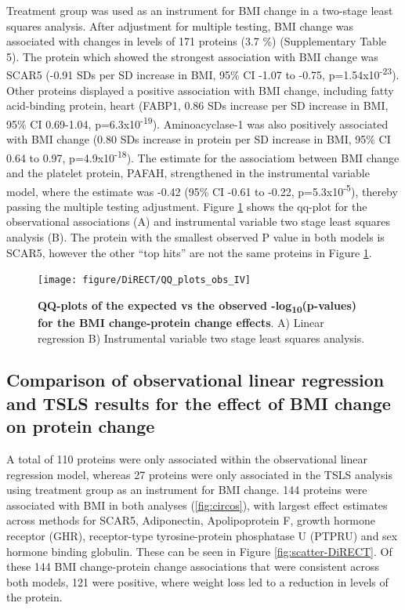 \documentclass[11pt,twoside]{bristolthesis}
\begin{document}
Treatment group was used as an instrument for BMI change in a two-stage least squares analysis. After adjustment for multiple testing, BMI change was associated with changes in levels of 171 proteins (3.7 \%) (Supplementary Table 5). The protein which showed the strongest association with BMI change was SCAR5 (-0.91 SDs per SD increase in BMI, 95\% CI -1.07 to -0.75, p=1.54x10\textsuperscript{-23}). Other proteins displayed a positive association with BMI change, including fatty acid-binding protein, heart (FABP1, 0.86 SDs increase per SD increase in BMI, 95\% CI 0.69-1.04, p=6.3x10\textsuperscript{-19}). Aminoacyclase-1 was also positively associated with BMI change (0.80 SDs increase in protein per SD increase in BMI, 95\% CI 0.64 to 0.97, p=4.9x10\textsuperscript{-18}). The estimate for the associatiom between BMI change and the platelet protein, PAFAH, strengthened in the instrumental variable model, where the estimate was -0.42 (95\% CI -0.61 to -0.22, p=5.3x10\textsuperscript{-5}), thereby passing the multiple testing adjustment. Figure \ref{fig:qq-plot-DiRECT} shows the qq-plot for the observational associations (A) and instrumental variable two stage least squares analysis (B). The protein with the smallest observed P value in both models is SCAR5, however the other ``top hits'' are not the same proteins in Figure \ref{fig:qq-plot-DiRECT}.



\begin{figure}
\texttt{[image: figure/DiRECT/QQ\_plots\_obs\_IV]} \caption[QQ-plots of the expected vs the observed -log\textsubscript{10}(p-values) for the BMI change-protein change effects]{\textbf{QQ-plots of the expected vs the observed -log\textsubscript{10}(p-values) for the BMI change-protein change effects}. A) Linear regression B) Instrumental variable two stage least squares analysis.}\label{fig:qq-plot-DiRECT}
\end{figure}
\hypertarget{comparison-of-observational-linear-regression-and-tsls-results-for-the-effect-of-bmi-change-on-protein-change}{%
\subsection{Comparison of observational linear regression and TSLS results for the effect of BMI change on protein change}\label{comparison-of-observational-linear-regression-and-tsls-results-for-the-effect-of-bmi-change-on-protein-change}}

A total of 110 proteins were only associated within the observational linear regression model, whereas 27 proteins were only associated in the TSLS analysis using treatment group as an instrument for BMI change. 144 proteins were associated with BMI in both analyses (\ref{fig:circos}), with largest effect estimates across methods for SCAR5, Adiponectin, Apolipoprotein F, growth hormone receptor (GHR), receptor-type tyrosine-protein phosphatase U (PTPRU) and sex hormone binding globulin. These can be seen in Figure \ref{fig:scatter-DiRECT}. Of these 144 BMI change-protein change associations that were consistent across both models, 121 were positive, where weight loss led to a reduction in levels of the protein.
\end{document}
